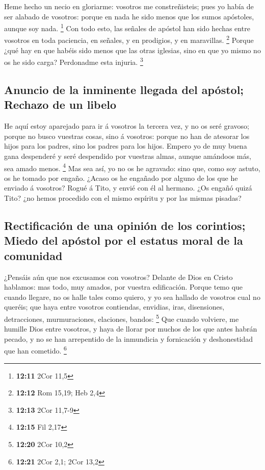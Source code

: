  Heme hecho un necio en gloriarme: vosotros me
constreñisteis; pues yo había de ser alabado de vosotros: porque en nada
he sido menos que los sumos apóstoles, aunque soy nada. \footnote{\textbf{12:11}
  2Cor 11,5}  Con todo esto, las señales de apóstol han
sido hechas entre vosotros en toda paciencia, en señales, y en
prodigios, y en maravillas. \footnote{\textbf{12:12} Rom 15,19; Heb 2,4}
 Porque ¿qué hay en que habéis sido menos que las otras
iglesias, sino en que yo mismo no os he sido carga? Perdonadme esta
injuria. \footnote{\textbf{12:13} 2Cor 11,7-9}

\hypertarget{anuncio-de-la-inminente-llegada-del-apuxf3stol-rechazo-de-un-libelo}{%
\subsection{Anuncio de la inminente llegada del apóstol; Rechazo de un
libelo}\label{anuncio-de-la-inminente-llegada-del-apuxf3stol-rechazo-de-un-libelo}}

 He aquí estoy aparejado para ir á vosotros la tercera
vez, y no os seré gravoso; porque no busco vuestras cosas, sino á
vosotros: porque no han de atesorar los hijos para los padres, sino los
padres para los hijos.  Empero yo de muy buena gana
despenderé y seré despendido por vuestras almas, aunque amándoos más,
sea amado menos. \footnote{\textbf{12:15} Fil 2,17}  Mas
sea así, yo no os he agravado: sino que, como soy astuto, os he tomado
por engaño.  ¿Acaso os he engañado por alguno de los que
he enviado á vosotros?  Rogué á Tito, y envié con él al
hermano. ¿Os engañó quizá Tito? ¿no hemos procedido con el mismo
espíritu y por las mismas pisadas?

\hypertarget{rectificaciuxf3n-de-una-opiniuxf3n-de-los-corintios-miedo-del-apuxf3stol-por-el-estatus-moral-de-la-comunidad}{%
\subsection{Rectificación de una opinión de los corintios; Miedo del
apóstol por el estatus moral de la
comunidad}\label{rectificaciuxf3n-de-una-opiniuxf3n-de-los-corintios-miedo-del-apuxf3stol-por-el-estatus-moral-de-la-comunidad}}

 ¿Pensáis aún que nos excusamos con vosotros? Delante de
Dios en Cristo hablamos: mas todo, muy amados, por vuestra edificación.
 Porque temo que cuando llegare, no os halle tales como
quiero, y yo sea hallado de vosotros cual no queréis; que haya entre
vosotros contiendas, envidias, iras, disensiones, detracciones,
murmuraciones, elaciones, bandos: \footnote{\textbf{12:20} 2Cor 10,2}
 Que cuando volviere, me humille Dios entre vosotros, y
haya de llorar por muchos de los que antes habrán pecado, y no se han
arrepentido de la inmundicia y fornicación y deshonestidad que han
cometido. \footnote{\textbf{12:21} 2Cor 2,1; 2Cor 13,2}

